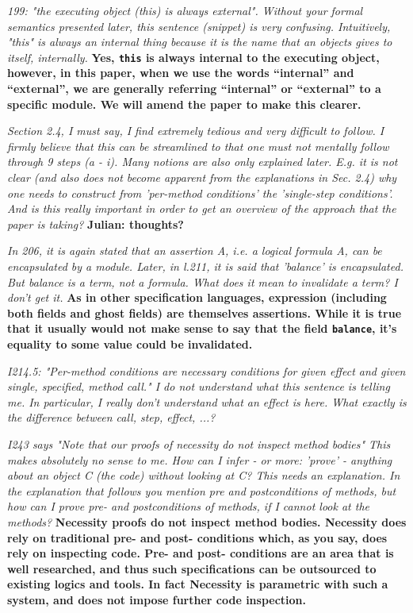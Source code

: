 \documentclass[11pt]{amsart}
\newcommand{\rev}[1]{\emph #1}
\newcommand{\us}[1]{\bf #1}
\begin{document}
{\rev {{199: "the executing object (this) is always external". Without your formal semantics presented later, this sentence (snippet) is very confusing. Intuitively, "this" is always an internal thing because it is the name that an objects gives to itself, internally. }}}
{\us{Yes, \texttt{this} is always internal to the executing object, however, in this paper, when we use the words ``internal'' and ``external'', we are generally referring ``internal'' or ``external'' to 
a specific module. We will amend the paper to make this clearer.}}

{\rev {{ Section 2.4, I must say, I find extremely tedious and very difficult to follow. I firmly believe that this can be streamlined to that one must not mentally follow through 9 steps (a - i). Many notions are also only explained later. E.g. it is not clear (and also does not become apparent from the explanations in Sec. 2.4) why one needs to construct from 'per-method conditions' the 'single-step conditions'. And is this really important in order to get an overview of the approach that the paper is taking? }}}
{\us{Julian: thoughts?}}

 {\rev {{  In 206, it is again stated that an assertion A, i.e. a logical formula A, can be encapsulated by a module. Later, in l.211, it is said that 'balance' is encapsulated. But balance is a term, not a formula. What does it mean to invalidate a term? I don't get it. }}}
 {\us{As in other specification languages, expression (including both fields and ghost fields) are themselves assertions. While it is true that it usually would 
 not make sense to say that the field \texttt{balance}, it's equality to some value could be invalidated.}}

{\rev {{I214.5: "Per-method conditions are necessary conditions for given effect and given single, specified, method call." I do not understand what this sentence is telling me. In particular, I really don't understand what an effect is here. What exactly is the difference between call, step, effect, ...? }}}

{\rev {{I243 says "Note that our proofs of necessity do not inspect method bodies" This makes absolutely no sense to me. How can I infer - or more: 'prove' - anything about an object C (the code) without looking at C? This needs an explanation. In the explanation that follows you mention pre and postconditions of methods, but how can I prove pre- and postconditions of methods, if I cannot look at the methods? }}}
{\us{Necessity proofs do not inspect method bodies. Necessity does rely on traditional pre- and post- conditions which, as you say, does rely on inspecting code. Pre- and post- conditions are an area that is well researched, and thus such specifications can be outsourced to existing logics and tools. In fact Necessity is parametric with such a system, and does not impose further code inspection.}}
\end{document}
